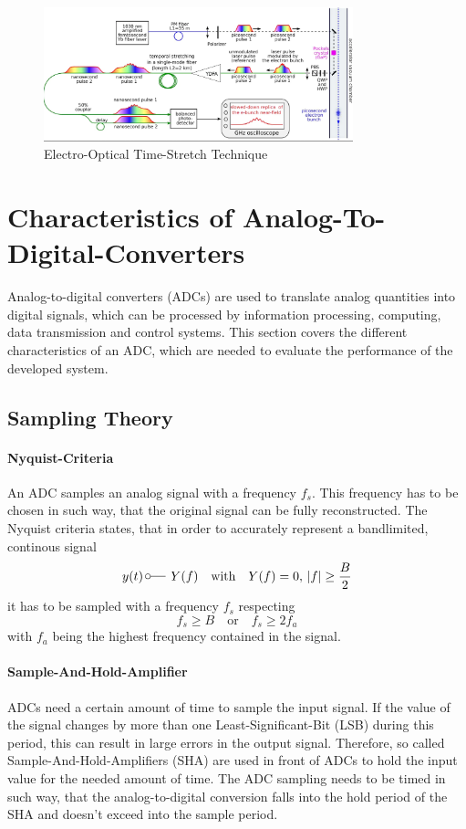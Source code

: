 \begin{figure}[H]
	\centering
	\includegraphics[width = 0.8\textwidth]{chap/02-theory/img/EO.png}
	\caption{Electro-Optical Time-Stretch Technique \cite{Bielawski2019}}
	\label{fig:eo}
\end{figure}


\newpage
\section{Characteristics of Analog-To-Digital-Converters}
Analog-to-digital converters (ADCs) are used to translate analog quantities into digital signals, which can be processed by information processing, computing, data transmission and control systems. This section covers the different characteristics of an ADC, which are needed to evaluate the performance of the developed system. 
\subsection{Sampling Theory}

\paragraph{Nyquist-Criteria}
An ADC samples an analog signal with a frequency $f_s$. This frequency has to be chosen in such way, that the original signal can be fully reconstructed. The Nyquist criteria states, that in order to accurately represent a bandlimited, continous signal
\begin{equation}
y (t) \, \fourier  Y(f) \quad \text{with} \quad Y(f) = 0, \, |f| \geq \frac{B}{2}
\end{equation}
it has to be sampled with a frequency $f_s$ respecting
\begin{equation}
f_s \geq B \quad \text{or} \quad f_s \geq 2 f_a
\end{equation}
with $f_a$ being the highest frequency contained in the signal. \cite{walt} \cite{puente2015}
\paragraph{Sample-And-Hold-Amplifier}
ADCs need a certain amount of time to sample the input signal. If the value of the signal changes by more than one Least-Significant-Bit (LSB) during this period, this can result in large errors in the output signal. Therefore, so called Sample-And-Hold-Amplifiers (SHA) are used in front of ADCs to hold the  input value for the needed amount of time. The ADC sampling needs to be timed in such way, that the analog-to-digital conversion falls into the hold period of the SHA and doesn't exceed into the sample period.



